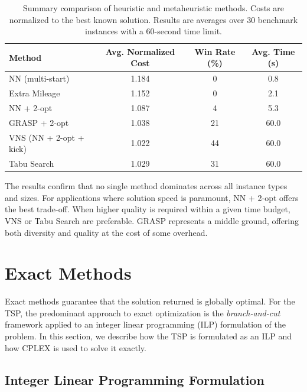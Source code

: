 \documentclass{article}
\begin{document}
\begin{table}[H]
\centering
\caption{Summary comparison of heuristic and metaheuristic methods. Costs are normalized to
the best known solution. Results are averages over 30 benchmark instances with a 60-second
time limit.}
\label{tab:method_comparison}
\begin{tabular}{@{}lccc@{}}
\toprule
Method            & Avg. Normalized Cost & Win Rate (\%) & Avg. Time (s) \\
\midrule
NN (multi-start)        & 1.184 & 0  & 0.8  \\
Extra Mileage           & 1.152 & 0  & 2.1  \\
NN + 2-opt              & 1.087 & 4  & 5.3  \\
GRASP + 2-opt           & 1.038 & 21 & 60.0 \\
VNS (NN + 2-opt + kick) & 1.022 & 44 & 60.0 \\
Tabu Search             & 1.029 & 31 & 60.0 \\
\bottomrule
\end{tabular}
\end{table}

The results confirm that no single method dominates across all instance types and sizes.
For applications where solution speed is paramount, NN + 2-opt offers the best trade-off.
When higher quality is required within a given time budget, VNS or Tabu Search are
preferable. GRASP represents a middle ground, offering both diversity and quality at the cost
of some overhead.


\section{Exact Methods}

Exact methods guarantee that the solution returned is globally optimal. For the TSP, the
predominant approach to exact optimization is the \textit{branch-and-cut} framework applied
to an integer linear programming (ILP) formulation of the problem. In this section, we
describe how the TSP is formulated as an ILP and how CPLEX is used to solve it exactly.

\subsection{Integer Linear Programming Formulation}
\end{document}
